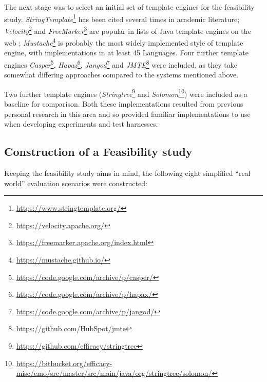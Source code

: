 The next stage was to select an initial set of template engines for the feasibility study. \emph{StringTemplate}\footnote{\url{https://www.stringtemplate.org/}} has been cited several times in academic literature; \emph{Velocity}\footnote{\url{https://velocity.apache.org/}} and \emph{FreeMarker}\footnote{\url{https://freemarker.apache.org/index.html}} are popular in lists of Java template engines on the web \citep{Dzone2016}; \emph{Mustache}\footnote{\url{https://mustache.github.io/}} is probably the most widely implemented style of template engine, with implementations in at least 45 Languages. Four further template engines \emph{Casper}\footnote{\url{https://code.google.com/archive/p/casper/}}, \emph{Hapax}\footnote{\url{https://code.google.com/archive/p/hapax/}}, \emph{Jangod}\footnote{\url{https://code.google.com/archive/p/jangod/}} and \emph{JMTE}\footnote{\url{https://github.com/HubSpot/jmte}} were included, as they take somewhat differing approaches compared to the systems mentioned above.

Two further template engines (\emph{Stringtree}\footnote{\url{https://github.com/efficacy/stringtree}} and \emph{Solomon}\footnote{\url{https://bitbucket.org/efficacy-misc/emo/src/master/src/main/java/org/stringtree/solomon/}}) were included as a baseline for comparison. Both these implementations resulted from previous personal research in this area and so provided familiar implementations to use when developing experiments and test harnesses.

\subsection{Construction of a Feasibility study}

Keeping the feasibility study aims in mind, the following eight simplified \enquote{real world} evaluation scenarios were constructed:

